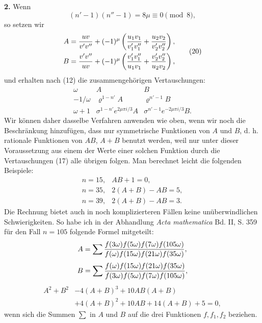 \documentclass[11pt]{article}
\begin{document}
\noindent\textbf{2.} Wenn
\[
 (n'-1)(n''-1)=8\mu\equiv0\pmod8,
\]
so setzen wir
\begin{equation}
\begin{aligned}
A&={uv\over v'v''}+(-1)^\mu\left({u_1v_1\over v'_1v''_1}+{u_2v_2\over v'_2v''_2}\right),\\
B&={v'v''\over uv}+(-1)^\mu\left({v'_1v''_1\over u_1v_1}+{v'_2v''_2\over u_2v_2}\right),
\end{aligned}
\tag{20}
\end{equation}
und erhalten nach (12) die zusammengehörigen Vertauschungen:
\begin{equation}
\begin{array}{c|cc}
\omega&A&B\\[0.2em]
-1/\omega&\varrho^{1-n'}A&\varrho^{n'-1}B\\[0.2em]
\omega+1&\sigma^{1-n'}e^{2\mu\pi i/3}A&\sigma^{n'-1}e^{-2\mu\pi i/3}B.
\end{array}
\tag{21}
\end{equation}
Wir können daher dasselbe Verfahren anwenden wie oben, wenn wir noch die Beschränkung hinzufügen, dass nur symmetrische Funktionen von $A$ und $B$, d. h. rationale Funktionen von $AB$, $A+B$ benutzt werden, weil nur unter dieser Voraussetzung aus einem der Werte einer solchen Funktion durch die Vertauschungen (17) alle übrigen folgen. Man berechnet leicht die folgenden Beispiele:
\begin{equation}
\begin{array}{rl}
n=15,& AB+1=0,\\
n=35,& 2(A+B)-AB=5,\\
n=39,& 2(A+B)-AB=3.
\end{array}
\tag{22}
\end{equation}
Die Rechnung bietet auch in noch komplizierteren Fällen keine unüberwindlichen Schwierigkeiten. So habe ich in der Abhandlung \emph{Acta mathematica} Bd. II, S. 359 für den Fall $n=105$ folgende Formel mitgeteilt:
\[
 A=\sum {f(3\omega)f(5\omega)f(7\omega)f(105\omega)\over f(\omega)f(15\omega)f(21\omega)f(35\omega)},
\]
\[
 B=\sum {f(\omega)f(15\omega)f(21\omega)f(35\omega)\over f(3\omega)f(5\omega)f(7\omega)f(105\omega)},
\]
\[
\begin{aligned}
 A^2+B^2&-4(A+B)^3+10AB(A+B)\\
&+4(A+B)^2+10AB+14(A+B)+5=0,
\end{aligned}
\]
wenn sich die Summen $\sum$ in $A$ und $B$ auf die drei Funktionen $f,f_1,f_2$ beziehen.


\clearpage
\end{document}
